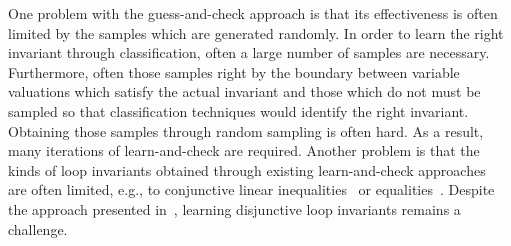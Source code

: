 One problem with the guess-and-check approach is that its effectiveness is often limited by the samples which are generated randomly.
In order to learn the right invariant through classification, often a large number of samples are necessary.
Furthermore, often those samples right by the boundary between variable valuations which satisfy the actual invariant and those which do not must be sampled so that classification techniques would identify the right invariant. Obtaining those samples through random sampling is often hard.
As a result, many iterations of learn-and-check are required. Another problem is that the kinds of loop invariants obtained through existing learn-and-check approaches~\cite{sharma2012interpolants,sharma2013verification,DBLP:conf/esop/0001GHALN13,sharma2014invariant} are often limited, e.g., to conjunctive linear inequalities~\cite{sharma2012interpolants} or equalities~\cite{DBLP:conf/esop/0001GHALN13}. Despite the approach presented in~\cite{DBLP:conf/pldi/GulwaniSV08,DBLP:conf/cav/SharmaDDA11}, learning disjunctive loop invariants remains a challenge.


